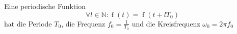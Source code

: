 Eine periodische Funktion
$$\forall l \in \mathbb{N} : \operatorname{f}(t) = \operatorname{f}(t + l T_0)$$
hat die Periode $T_0$, die Frequenz $f_0 = \frac{1}{T_0}$ und die Kreisfrequenz $\omega_0 = 2 \pi f_0$
